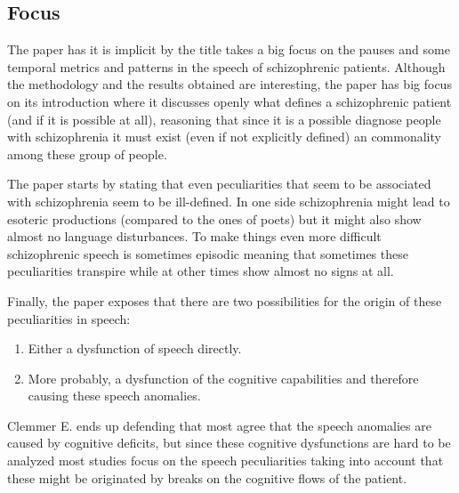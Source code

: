 \documentclass{Paper_Summary}
\begin{document}
\makepapertitle

\breakline

\begin{center}
    \section*{Focus}
\end{center}
    
    The paper has it is implicit by the title takes a big focus on the pauses and some temporal metrics and patterns in the speech of schizophrenic patients.
    Although the methodology and the results obtained are interesting, the paper has big focus on its introduction where it discusses openly what defines a schizophrenic patient (and if it is possible at all), reasoning that since it is a possible diagnose people with schizophrenia it must exist (even if not explicitly defined) an commonality among these group of people.
    
    The paper starts by stating that even peculiarities that seem to be associated with schizophrenia seem to be ill-defined. In one side schizophrenia might lead to esoteric productions (compared to the ones of poets) but it might also show almost no language disturbances. To make things even more difficult schizophrenic speech is sometimes episodic meaning that sometimes these peculiarities transpire while at other times show almost no signs at all.

    Finally, the paper exposes that there are two possibilities for the origin of these peculiarities in speech:
    \begin{enumerate}
        \item Either a dysfunction of speech directly.
        \item More probably, a dysfunction of the cognitive capabilities and therefore causing these speech anomalies.
    \end{enumerate}

    Clemmer E. ends up defending that most agree that the speech anomalies are caused by cognitive deficits, but since these cognitive dysfunctions are hard to be analyzed most studies focus on the speech peculiarities taking into account that these might be originated by breaks on the cognitive flows of the patient.

\breakline

\newpage
\end{document}
